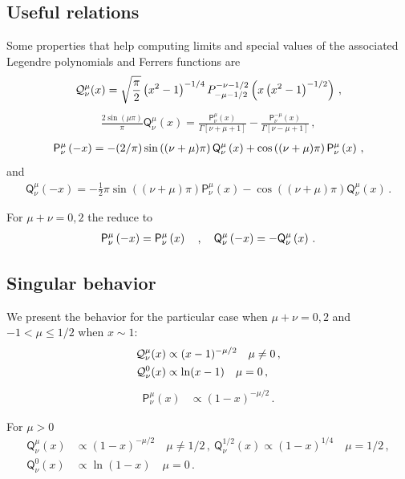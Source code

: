 \documentclass[aps,10pt,prd,groupedaddress,nofootinbib,notitlepage,eqsecnum,preprintnumbers]{revtex4-1}
\begin{document}
\subsection{Useful relations}
Some properties that help computing limits and special values of the associated Legendre polynomials and Ferrers functions are
\begin{align}
{\cal Q}_{\nu}^\mu(x)=\sqrt{\frac{\pi}{2}}\left(x^2-1\right)^{-1/4}P^{-\nu-1/2}_{-\mu-1/2}\left(x\left(x^{2}-1\right)^{-1/2}\right)\,,
\end{align}
\begin{align}
\frac{2\sin(\mu\pi)}{\pi}\mathsf{Q}_\nu^{\mu}(x)=\frac{\mathsf{P}^\mu_\nu(x)}{\Gamma[\nu+\mu+1]}-\frac{\mathsf{P}^{-\mu}_\nu(x)}{\Gamma[\nu-\mu+1]}\,,
\end{align}
\begin{align}
\mathsf{P}^{%
\mu}_{\nu}\left(-x\right)=-(2/\pi)\sin\left((\nu+\mu)\pi\right)\mathsf{Q}^{\mu}_{\nu}\left(x\right)+\cos%
\left((\nu+\mu)\pi\right)\mathsf{P}^{\mu}_{\nu}\left(x\right)\,,
\end{align}
and
\begin{align}
\mathsf{Q}^{\mu}_{\nu}\left(-x\right)=-\tfrac{1}{2}\pi\sin\left((\nu+\mu)\pi\right)\mathsf{P}^{\mu}_{\nu}\left(x%
\right)-\cos\left((\nu+\mu)\pi\right)\mathsf{Q}^{\mu}_{\nu}\left(x\right)\,.
\end{align}

For $\mu+\nu=0,2$ the reduce to
\begin{align}
\mathsf{P}^{%
\mu}_{\nu}\left(-x\right)=\mathsf{P}^{\mu}_{\nu}\left(x\right)\quad,\quad\mathsf{Q}^{\mu}_{\nu}\left(-x\right)=-\mathsf{Q}^{\mu}_{\nu}\left(x\right)\,.
\end{align}

\subsection{Singular behavior}
We present the behavior for the particular case when $\mu+\nu=0,2$ and $-1<\mu\leq1/2$ when $x\sim 1$:
\begin{align}
{\cal Q}_{\nu}^\mu(x)&\propto (x-1)^{-\mu/2} \quad \mu\neq0\,,\\
{\cal Q}_{\nu}^0(x)&\propto \ln(x-1) \quad \mu=0\,,
\end{align}
\begin{align}
\mathsf{P}_{\nu}^\mu(x)&\propto (1-x)^{-\mu/2}\,.
\end{align}

For $\mu>0$
\begin{align}
\mathsf{Q}_{\nu}^\mu(x)&\propto (1-x)^{-\mu/2} \quad \mu\neq1/2\,,\
\mathsf{Q}_{\nu}^{1/2}(x)\propto (1-x)^{1/4} \quad \mu=1/2\,,\\
\mathsf{Q}_{\nu}^0(x)&\propto \ln(1-x) \quad \mu=0\,.
\end{align}
\end{document}
